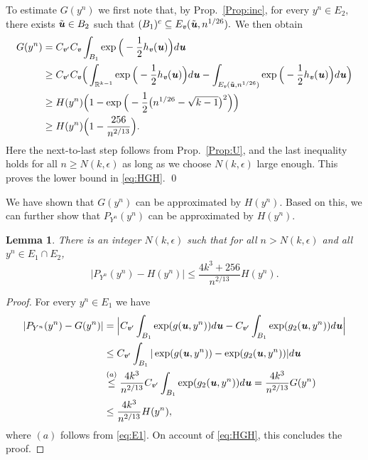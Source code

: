 \documentclass[11pt,onecolumn]{IEEEtran}
\newtheorem{lemma}[theorem]{Lemma}
\def\mathbi#1{{\textbf{\textit #1}}}
\begin{document}
To estimate $G(y^n)$ we first note that, by Prop.~\ref{Prop:inc}, for every $y^n \in E_2,$ there exists $\tilde{\mathbi{u}} \in B_2$ such that
$
(B_1)^c \subseteq E_{\mathbi{v}}(\tilde{\mathbi{u}}, n^{1/26}).
$
We then obtain
\begin{align*}
G(y^n)  & = C_{\mathbi{v}'}  C_{\mathbi{v}}  \int_{B_1} 
\exp\Big( - \frac{1}{2} h_{\mathbi{v}}(\mathbi{u})  \Big) d\mathbi{u} \nonumber\\
& \ge C_{\mathbi{v}'}  C_{\mathbi{v}} \Big( \int_{\mathbb{R}^{k-1}} 
\exp\Big( - \frac{1}{2} h_{\mathbi{v}}(\mathbi{u})  \Big) d\mathbi{u} -  \int_{E_{\mathbi{v}}(\tilde{\mathbi{u}}, n^{1/26})} 
\exp\Big( - \frac{1}{2} h_{\mathbi{v}}(\mathbi{u})  \Big)  d\mathbi{u} \Big) \\
& \ge H(y^n) \Big( 1 -  
\exp \Big(- \frac{1}{2} \big( n^{1/26} - \sqrt{k-1} \big)^2 \Big) \Big) \\
& \ge H(y^n) \Big( 1 -  
\frac{256}{n^{2/13}} \Big).\label{eq:bG}
\end{align*}
Here the  next-to-last step follows from Prop.~\ref{Prop:U}, and the last inequality holds for all $n\ge N(k,\epsilon)$
as long as we choose $N(k,\epsilon)$ large enough.
This proves the lower bound in \eqref{eq:HGH}.
\qed

\vspace*{.1in}
We have shown that $G(y^n)$ can be approximated by $H(y^n)$. Based on this, we can further show that $P_{Y^n}(y^n)$ can be approximated by $H(y^n)$.
 
\begin{lemma}\label{lemma:PH}  There is an integer $N(k,\epsilon)$ such that for all $n>N(k,\epsilon)$ and all
$y^n \in E_1\cap E_2$,
\begin{equation}\label{eq:PH}
\Big| P_{Y^n}(y^n)- H(y^n) \Big| 
 \le \frac{4k^3+256}{n^{2/13}} 
H(y^n).
\end{equation}
\end{lemma}
\begin{proof}
For every $y^n \in E_1$ we have
\begin{align*}
|P_{Y^n}(y^n)- G(y^n) | & = \Big| C_{\mathbi{v}'} \int_{ B_1}   \exp(g(\mathbi{u},y^n)) d\mathbi{u} - C_{\mathbi{v}'} \int_{ B_1}   \exp(g_2(\mathbi{u},y^n)) d\mathbi{u} \Big| \\
& \le C_{\mathbi{v}'} \int_{ B_1}   |\exp(g(\mathbi{u},y^n)) - \exp(g_2(\mathbi{u},y^n))| d\mathbi{u} \\
& \overset{(a)}{\le} \frac{4k^3}{n^{2/13}} C_{\mathbi{v}'} \int_{ B_1}   \exp(g_2(\mathbi{u},y^n)) d\mathbi{u} = \frac{4k^3}{n^{2/13}} G(y^n) \\
& \le \frac{4k^3}{n^{2/13}} H(y^n),
\end{align*}
where $(a)$ follows from \eqref{eq:E1}. On account of \eqref{eq:HGH}, this concludes the proof.
\end{proof} 
\end{document}
